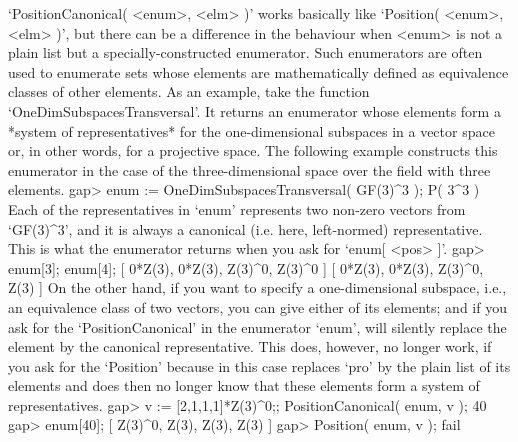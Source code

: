 %
`PositionCanonical(  <enum>,  <elm> )'  works  basically  like `Position(
<enum>,  <elm> )', but there  can be a   difference in the behaviour when
<enum> is not a  plain list but  a specially-constructed enumerator. Such
enumerators   are often used   to    enumerate sets  whose elements   are
mathematically defined as equivalence  classes  of other elements.  As an
example,  take the function   `OneDimSubspacesTransversal'. It returns an
enumerator whose  elements  form a  *system  of representatives* for  the
one-dimensional subspaces in a  vector space or, in   other words, for  a
projective space. The following example constructs this enumerator in the
case of the three-dimensional space over the field with three elements.
\beginexample
    gap> enum := OneDimSubspacesTransversal( GF(3)^3 );
    P( 3^3 )
\endexample
Each of  the representatives in   `enum' represents two  non-zero vectors
from  `GF(3)^3', and  it is always  a canonical  (i.e. here, left-normed)
representative.  This is what  the  enumerator returns  when you  ask for
`enum[ <pos> ]'.
\beginexample
    gap> enum[3];  enum[4];
    [ 0*Z(3), 0*Z(3), Z(3)^0, Z(3)^0 ]
    [ 0*Z(3), 0*Z(3), Z(3)^0, Z(3) ]
\endexample
On the  other hand, if you  want  to specify  a one-dimensional subspace,
i.e., an equivalence  class of two  vectors, you can  give either of  its
elements;  and if you ask for  the `PositionCanonical'  in the enumerator
`enum',  {\GAP} will  silently replace   the   element by  the  canonical
representative.  This does, however,  no longer work,  if you ask for the
`Position' because in  this case {\GAP}  replaces `pro' by the plain list
of its elements and does  then no longer know  that these elements form a
system of representatives.
\beginexample
    gap> v := [2,1,1,1]*Z(3)^0;;  PositionCanonical( enum, v );
    40
    gap> enum[40];
    [ Z(3)^0, Z(3), Z(3), Z(3) ]
    gap> Position( enum, v );
    fail
\endexample

